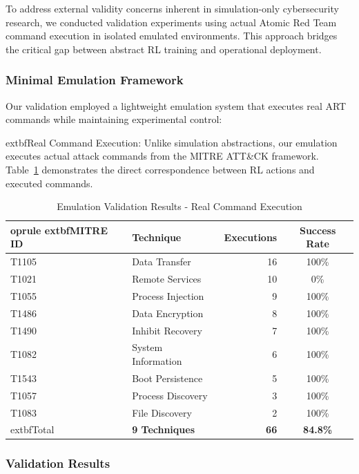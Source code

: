 \documentclass[12pt]{article}
\theoremstyle{definition}
\theoremstyle{plain}
\begin{document}
To address external validity concerns inherent in simulation-only cybersecurity research, we conducted validation experiments using actual Atomic Red Team command execution in isolated emulated environments. This approach bridges the critical gap between abstract RL training and operational deployment.

\subsubsection{Minimal Emulation Framework}

Our validation employed a lightweight emulation system that executes real ART commands while maintaining experimental control:

	extbf{Real Command Execution}: Unlike simulation abstractions, our emulation executes actual attack commands from the MITRE ATT\&CK framework. Table~\ref{tab:emulation_validation} demonstrates the direct correspondence between RL actions and executed commands.

\begin{table}[H]
\centering
\caption{Emulation Validation Results - Real Command Execution}
\label{tab:emulation_validation}
\begin{tabular}{llrc}
	oprule
	extbf{MITRE ID} & \textbf{Technique} & \textbf{Executions} & \textbf{Success Rate} \\
\midrule
T1105 & Data Transfer & 16 & 100\% \\
T1021 & Remote Services & 10 & 0\% \\
T1055 & Process Injection & 9 & 100\% \\
T1486 & Data Encryption & 8 & 100\% \\
T1490 & Inhibit Recovery & 7 & 100\% \\
T1082 & System Information & 6 & 100\% \\
T1543 & Boot Persistence & 5 & 100\% \\
T1057 & Process Discovery & 3 & 100\% \\
T1083 & File Discovery & 2 & 100\% \\
\midrule
	extbf{Total} & \textbf{9 Techniques} & \textbf{66} & \textbf{84.8\%} \\
\bottomrule
\end{tabular}
\end{table}

\subsubsection{Validation Results}
\end{document}
